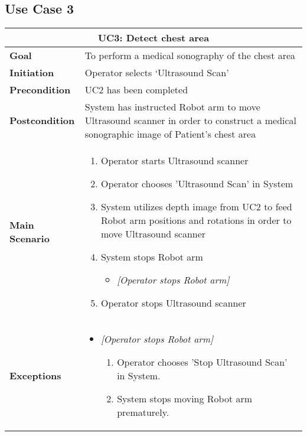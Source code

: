 \subsection{Use Case 3}
\begin{tabular}{ | l | p{} | }
  \hline
  \multicolumn{2}{|c|}{\textbf{UC3: Detect chest area}} \\ \hline
  \textbf{Goal} & To perform a medical sonography of the chest area \\ \hline
  \textbf{Initiation} & Operator selects ‘Ultrasound Scan’ \\ \hline
  \textbf{Precondition} & UC2 has been completed \\ \hline
  \textbf{Postcondition} & System has instructed Robot arm to move Ultrasound scanner in order to construct a medical sonographic image of Patient’s chest area  \\ \hline
  \textbf{Main Scenario} & 
  	{\begin{enumerate} 
  	\item Operator starts Ultrasound scanner
  	\item Operator chooses 'Ultrasound Scan' in System
  	\item System utilizes depth image from UC2 to feed Robot arm positions and rotations in order to move Ultrasound scanner
  	\item System stops Robot arm
  		\begin{itemize}
  		\item \textit{[Operator stops Robot arm]}
  		\end{itemize}
  	\item Operator stops Ultrasound scanner
  	\end{enumerate}} \\ \hline
  \textbf{Exceptions} & 
  	{\begin{itemize} 
  	\item \textit{[Operator stops Robot arm]}
  		\begin{enumerate}
  		\item Operator chooses 'Stop Ultrasound Scan' in System.
  		\item System stops moving Robot arm prematurely.
  		\end{enumerate}
  	\end{itemize}} \\ \hline
\end{tabular}

